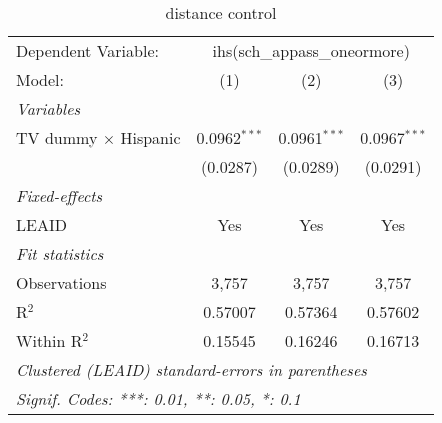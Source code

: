 \begin{table}[htbp]
\centering
\caption{distance control}
\begin{tabular}{lccc}
\tabularnewline\midrule\midrule
Dependent Variable:&\multicolumn{3}{c}{ihs(sch\_appass\_oneormore)}\\
Model:&(1) & (2) & (3)\\
\midrule \emph{Variables}&   &   &  \\
TV dummy $\times$ Hispanic & 0.0962$^{***}$ & 0.0961$^{***}$ & 0.0967$^{***}$\\
  &(0.0287) & (0.0289) & (0.0291)\\
\midrule \emph{Fixed-effects}&   &   &  \\
LEAID & Yes & Yes & Yes\\
\midrule \emph{Fit statistics}&  & & \\
Observations & 3,757&3,757&3,757\\
R$^2$ & 0.57007&0.57364&0.57602\\
Within R$^2$ & 0.15545&0.16246&0.16713\\
\midrule\midrule\multicolumn{4}{l}{\emph{Clustered (LEAID) standard-errors in parentheses}}\\
\multicolumn{4}{l}{\emph{Signif. Codes: ***: 0.01, **: 0.05, *: 0.1}}\\
\end{tabular}
\end{table}

